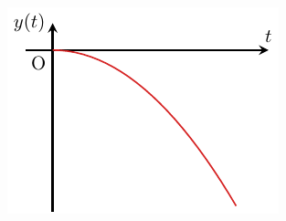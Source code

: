 \documentclass[../../main/main.tex]{subfiles}
\begin{document}
\begin{tcb*}
\begin{isd}
\begin{center}
{			}{%
				\includegraphics[width=.8\linewidth]{nov_y_prof}
			}%
		\end{center}
	\end{isd}
  \vspace{-25pt}
\end{tcb*}
\end{document}

